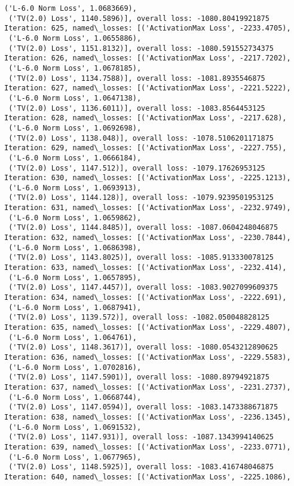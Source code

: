 \documentclass[10pt]{article}
\begin{document}
\begin{Verbatim}[commandchars=\\\{\}]
 ('L-6.0 Norm Loss', 1.0683669),
 ('TV(2.0) Loss', 1140.5896)], overall loss: -1080.80419921875
Iteration: 625, named\_losses: [('ActivationMax Loss', -2233.4705),
 ('L-6.0 Norm Loss', 1.0655886),
 ('TV(2.0) Loss', 1151.8132)], overall loss: -1080.591552734375
Iteration: 626, named\_losses: [('ActivationMax Loss', -2217.7202),
 ('L-6.0 Norm Loss', 1.0678185),
 ('TV(2.0) Loss', 1134.7588)], overall loss: -1081.8935546875
Iteration: 627, named\_losses: [('ActivationMax Loss', -2221.5222),
 ('L-6.0 Norm Loss', 1.0647138),
 ('TV(2.0) Loss', 1136.6011)], overall loss: -1083.8564453125
Iteration: 628, named\_losses: [('ActivationMax Loss', -2217.628),
 ('L-6.0 Norm Loss', 1.0692698),
 ('TV(2.0) Loss', 1138.048)], overall loss: -1078.5106201171875
Iteration: 629, named\_losses: [('ActivationMax Loss', -2227.755),
 ('L-6.0 Norm Loss', 1.0666184),
 ('TV(2.0) Loss', 1147.512)], overall loss: -1079.17626953125
Iteration: 630, named\_losses: [('ActivationMax Loss', -2225.1213),
 ('L-6.0 Norm Loss', 1.0693913),
 ('TV(2.0) Loss', 1144.128)], overall loss: -1079.9239501953125
Iteration: 631, named\_losses: [('ActivationMax Loss', -2232.9749),
 ('L-6.0 Norm Loss', 1.0659862),
 ('TV(2.0) Loss', 1144.8485)], overall loss: -1087.0604248046875
Iteration: 632, named\_losses: [('ActivationMax Loss', -2230.7844),
 ('L-6.0 Norm Loss', 1.0686398),
 ('TV(2.0) Loss', 1143.8025)], overall loss: -1085.913330078125
Iteration: 633, named\_losses: [('ActivationMax Loss', -2232.414),
 ('L-6.0 Norm Loss', 1.0657895),
 ('TV(2.0) Loss', 1147.4457)], overall loss: -1083.9027099609375
Iteration: 634, named\_losses: [('ActivationMax Loss', -2222.691),
 ('L-6.0 Norm Loss', 1.0687941),
 ('TV(2.0) Loss', 1139.572)], overall loss: -1082.050048828125
Iteration: 635, named\_losses: [('ActivationMax Loss', -2229.4807),
 ('L-6.0 Norm Loss', 1.064761),
 ('TV(2.0) Loss', 1148.3617)], overall loss: -1080.0543212890625
Iteration: 636, named\_losses: [('ActivationMax Loss', -2229.5583),
 ('L-6.0 Norm Loss', 1.0702816),
 ('TV(2.0) Loss', 1147.5901)], overall loss: -1080.89794921875
Iteration: 637, named\_losses: [('ActivationMax Loss', -2231.2737),
 ('L-6.0 Norm Loss', 1.0668744),
 ('TV(2.0) Loss', 1147.0594)], overall loss: -1083.1473388671875
Iteration: 638, named\_losses: [('ActivationMax Loss', -2236.1345),
 ('L-6.0 Norm Loss', 1.0691532),
 ('TV(2.0) Loss', 1147.931)], overall loss: -1087.1343994140625
Iteration: 639, named\_losses: [('ActivationMax Loss', -2233.0771),
 ('L-6.0 Norm Loss', 1.0677965),
 ('TV(2.0) Loss', 1148.5925)], overall loss: -1083.416748046875
Iteration: 640, named\_losses: [('ActivationMax Loss', -2225.1086),

\end{Verbatim}
\end{document}

